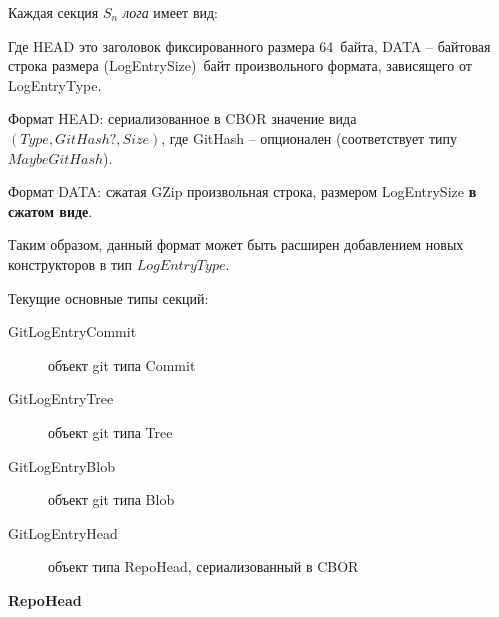 \documentclass[11pt,a4paper]{article}
\newcommand{\term}[2]{\textit{#2}}
\begin{document}
Каждая секция $S_n$ \term{log}{лога} имеет вид:

\begin{figure}[h!]
\centering
\end{figure}

Где HEAD это заголовок фиксированного размера 64~байта, DATA -- байтовая строка размера (LogEntrySize)~байт
произвольного формата, зависящего от LogEntryType.

Формат HEAD:  сериализованное в CBOR значение вида $(Type, GitHash?, Size)$, где GitHash --
опционален (соответствует типу $Maybe GitHash$).

Формат DATA: сжатая GZip произвольная строка, размером LogEntrySize \textbf{в сжатом виде}.

Таким образом, данный формат может быть расширен добавлением новых конструкторов в тип
$LogEntryType$.

Текущие основные типы секций:

\begin{description}
 \item[GitLogEntryCommit] объект git типа Commit
 \item[GitLogEntryTree]   объект git типа Tree
 \item[GitLogEntryBlob]   объект git типа Blob
 \item[GitLogEntryHead]   объект типа RepoHead, сериализованный в CBOR
\end{description}

\textbf{RepoHead}
\end{document}
